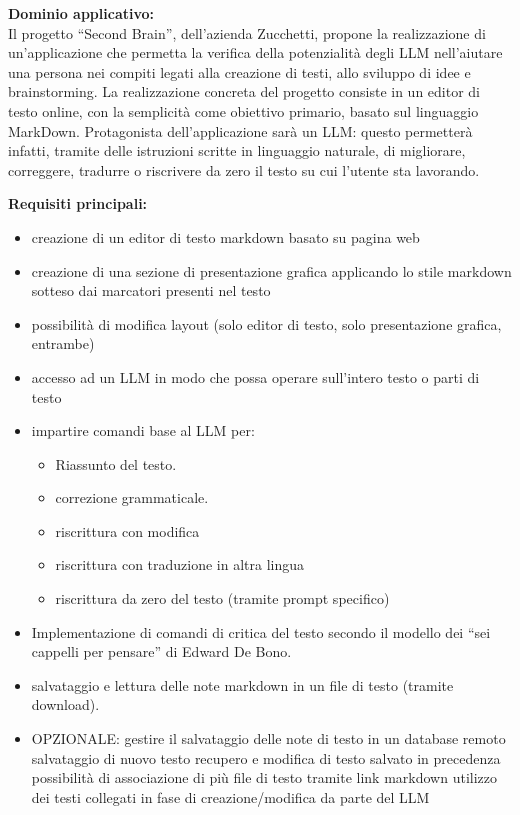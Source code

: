 \textbf{Dominio applicativo:} \\
{Il progetto “Second Brain”, dell’azienda Zucchetti, propone la realizzazione di un’applicazione che permetta la verifica della potenzialità degli LLM nell’aiutare una persona nei compiti legati alla creazione di testi, allo sviluppo di idee e brainstorming. La realizzazione concreta del progetto consiste in un editor di testo online, con la semplicità come obiettivo primario, basato sul linguaggio MarkDown. Protagonista dell’applicazione sarà un LLM: questo permetterà infatti, tramite delle istruzioni scritte in linguaggio naturale, di migliorare, correggere, tradurre o riscrivere da zero il testo su cui l’utente sta lavorando.}

\vspace{0.3cm}
\textbf{Requisiti principali:}
\begin{itemize}
	\item {creazione di un editor di testo markdown basato su pagina web}
	\item {creazione di una sezione di presentazione grafica applicando lo stile markdown sotteso dai marcatori presenti nel testo}
    \item possibilità di modifica layout (solo editor di testo, solo presentazione grafica, entrambe)
    \item accesso ad un LLM in modo che possa operare sull’intero testo o parti di testo
    \item impartire comandi base al LLM per:
        \begin{itemize}
            \item Riassunto del testo.
            \item correzione grammaticale.
            \item riscrittura con modifica
            \item riscrittura con traduzione in altra lingua
            \item riscrittura da zero del testo (tramite prompt specifico)
        \end{itemize}
\item Implementazione di comandi di critica del testo secondo il modello dei “sei cappelli per pensare” di Edward De Bono.
\item salvataggio e lettura delle note markdown in un file di testo (tramite download).
\item OPZIONALE: gestire il salvataggio delle note di testo in un database remoto salvataggio di nuovo testo recupero e modifica di testo salvato in precedenza possibilità di associazione di più file di testo tramite link markdown utilizzo dei testi collegati in fase di creazione/modifica da parte del LLM
\end{itemize}

